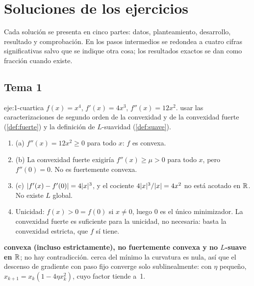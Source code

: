 \chapter{Soluciones de los ejercicios}
\label{ap:soluciones}

Cada solución se presenta en cinco partes: datos, planteamiento, desarrollo, resultado y comprobación. En los pasos intermedios se redondea a cuatro cifras significativas salvo que se indique otra cosa; los resultados exactos se dan como fracción cuando existe.

\section{Tema 1}

\begin{solucion}{eje:1-cuartica}
\datos $f(x)=x^{4}$, $f'(x)=4x^{3}$, $f''(x)=12x^{2}$.
\planteamiento usar las caracterizaciones de segundo orden de la convexidad y de la convexidad fuerte (\cref{def:fuerte}) y la definición de $L$-suavidad (\cref{def:suave}).
\pasos
\begin{enumerate}[label=\arabic*.]
  \item (a) $f''(x)=12x^{2}\ge 0$ para todo $x$: $f$ es convexa.
  \item (b) La convexidad fuerte exigiría $f''(x)\ge\mu>0$ para todo $x$, pero $f''(0)=0$. No es fuertemente convexa.
  \item (c) $\lvert f'(x)-f'(0)\rvert=4\lvert x\rvert^{3}$, y el cociente $4\lvert x\rvert^{3}/\lvert x\rvert=4x^{2}$ no está acotado en $\mathbb{R}$. No existe $L$ global.
  \item Unicidad: $f(x)>0=f(0)$ si $x\ne 0$, luego $0$ es el único minimizador. La convexidad fuerte es suficiente para la unicidad, no necesaria: basta la convexidad estricta, que $f$ sí tiene.
\end{enumerate}
\resultado \textbf{convexa (incluso estrictamente), no fuertemente convexa y no $L$-suave en $\mathbb{R}$}; no hay contradicción.
\comprobacion cerca del mínimo la curvatura es nula, así que el descenso de gradiente con paso fijo converge solo sublinealmente: con $\eta$ pequeño, $x_{k+1}=x_k(1-4\eta x_k^{2})$, cuyo factor tiende a~1.
\end{solucion}

